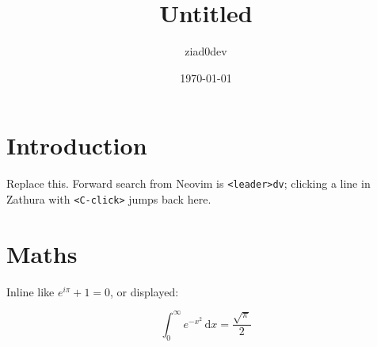 \documentclass[11pt,a4paper]{article}
\title{Untitled}
\author{ziad0dev}
\date{\today}
\begin{document}
\maketitle

\section{Introduction}

Replace this. Forward search from Neovim is \texttt{<leader>dv}; clicking a
line in Zathura with \texttt{<C-click>} jumps back here.

\section{Maths}

Inline like \(e^{i\pi} + 1 = 0\), or displayed:

\[
  \int_0^\infty e^{-x^2}\,\mathrm{d}x = \frac{\sqrt{\pi}}{2}
\]
\end{document}
